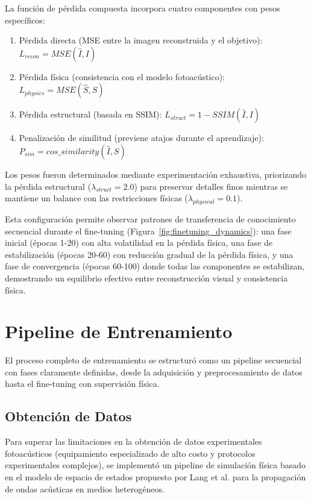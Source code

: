 La función de pérdida compuesta incorpora cuatro componentes con pesos específicos:

\begin{enumerate}
    \item Pérdida directa (MSE entre la imagen reconstruida y el objetivo): $L_{recon} = MSE(\hat{I}, I)$
    \item Pérdida física (consistencia con el modelo fotoacústico): $L_{physics} = MSE(\hat{S}, S)$
    \item Pérdida estructural (basada en SSIM): $L_{struct} = 1 - SSIM(\hat{I}, I)$
    \item Penalización de similitud (previene atajos durante el aprendizaje): $P_{sim} = cos\_similarity(\hat{I}, S)$
\end{enumerate}

Los pesos fueron determinados mediante experimentación exhaustiva, priorizando la pérdida estructural ($\lambda_{struct}=2.0$) para preservar detalles finos mientras se mantiene un balance con las restricciones físicas ($\lambda_{physical}=0.1$).

Esta configuración permite observar patrones de transferencia de conocimiento secuencial durante el fine-tuning (Figura~\ref{fig:finetuning_dynamics}): una fase inicial (épocas 1-20) con alta volatilidad en la pérdida física, una fase de estabilización (épocas 20-60) con reducción gradual de la pérdida física, y una fase de convergencia (épocas 60-100) donde todas las componentes se estabilizan, demostrando un equilibrio efectivo entre reconstrucción visual y consistencia física.

\section{Pipeline de Entrenamiento}

El proceso completo de entrenamiento se estructuró como un pipeline secuencial con fases claramente definidas, desde la adquisición y preprocesamiento de datos hasta el fine-tuning con supervisión física.

\subsection{Obtención de Datos}

Para superar las limitaciones en la obtención de datos experimentales fotoacústicos (equipamiento especializado de alto costo y protocolos experimentales complejos), se implementó un pipeline de simulación física basado en el modelo de espacio de estados propuesto por Lang et al. para la propagación de ondas acústicas en medios heterogéneos.

